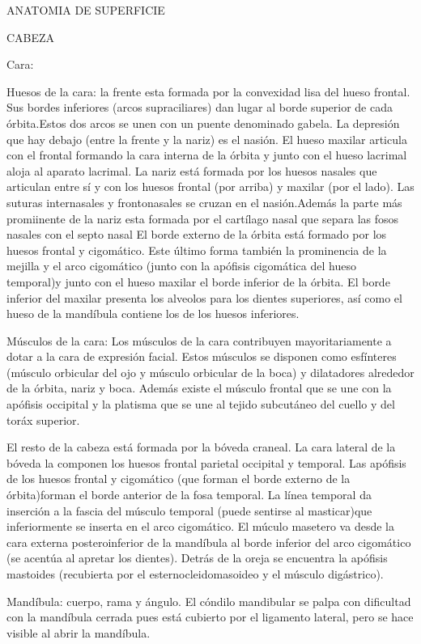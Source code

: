 ANATOMIA DE SUPERFICIE

CABEZA

Cara:

Huesos de la cara: la frente esta formada por la convexidad lisa del hueso frontal. Sus bordes inferiores (arcos supraciliares) dan lugar al borde superior de cada órbita.Estos dos arcos se unen con un puente denominado gabela. La depresión que hay debajo (entre la frente y la nariz) es el nasión.
El hueso maxilar articula con el frontal formando la cara interna de la órbita y junto con el hueso lacrimal aloja al aparato lacrimal.
La nariz  está formada por los huesos nasales que articulan entre sí y con los huesos frontal (por arriba) y maxilar (por el lado). Las suturas internasales y frontonasales se cruzan en el nasión.Además la parte más promiinente de la nariz esta formada por el cartílago nasal que separa las fosos nasales con el septo nasal
El borde externo de la órbita está formado por los huesos frontal y cigomático. Este último forma también la prominencia de la mejilla y el arco cigomático (junto con la apófisis cigomática del hueso temporal)y junto con el hueso maxilar el borde inferior de la órbita.
El borde inferior del maxilar presenta los alveolos para los dientes superiores, así como el hueso de la mandíbula contiene los de los huesos inferiores.

Músculos de la cara: Los músculos de la cara contribuyen mayoritariamente a dotar a la cara de expresión facial. Estos músculos se disponen como esfínteres (músculo orbicular del ojo y músculo orbicular de la boca) y dilatadores alrededor de la órbita, nariz y boca. Además existe el músculo frontal que se une con la apófisis occipital y la platisma que se une al tejido subcutáneo del cuello y del toráx superior.

El resto de la cabeza está formada por la bóveda craneal. La cara lateral de la bóveda la componen los huesos frontal parietal occipital y temporal.
Las apófisis de los huesos frontal y cigomático (que forman el borde externo de la órbita)forman el borde anterior de la fosa temporal. La línea temporal da inserción a la fascia del músculo temporal  (puede sentirse al masticar)que inferiormente se inserta en el arco cigomático.
El múculo masetero va desde la cara externa posteroinferior de la mandíbula al borde inferior del arco cigomático (se acentúa al apretar los dientes).
Detrás de la oreja se encuentra la apófisis mastoides (recubierta por el esternocleidomasoideo y el músculo digástrico).

Mandíbula: cuerpo, rama y ángulo. El cóndilo mandibular se palpa con dificultad con la mandíbula cerrada pues está cubierto por el ligamento lateral, pero se hace visible al abrir la mandíbula.

